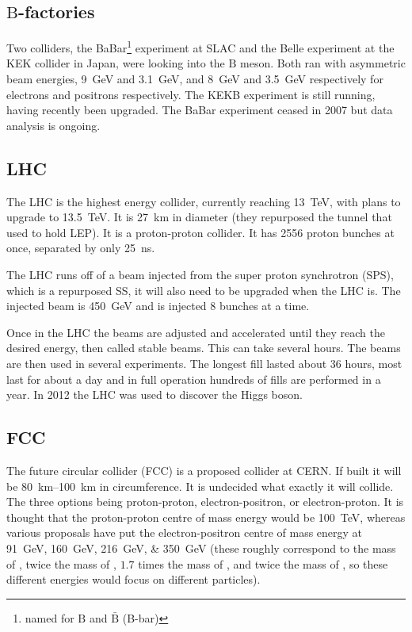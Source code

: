 \documentclass[fleqn]{NotesClass}
\makeatletter
\newcommand{\PBASE@B}{\mathrm{B}}
\newcommand{\PB}{\ensuremath{\PBASE@B}}
\newcommand{\APB}{\ensuremath{\bar{\PBASE@B}}}
\makeatother
\begin{document}
    \subsection{\protect\PB-factories}
    Two colliders, the BaBar\footnote{named for \PB{} and \APB{} (B-bar)} experiment at SLAC and the Belle experiment at the KEK collider in Japan, were looking into the \PB{} meson.
    Both ran with asymmetric beam energies, \qty{9}{\giga\electronvolt} and \qty{3.1}{\giga\electronvolt}, and \qty{8}{\giga\electronvolt} and \qty{3.5}{\giga\electronvolt} respectively for electrons and positrons respectively.
    The KEKB experiment is still running, having recently been upgraded.
    The BaBar experiment ceased in 2007 but data analysis is ongoing.
    
    \subsection{LHC}
    The LHC is the highest energy collider, currently reaching \qty{13}{\tera\electronvolt}, with plans to upgrade to \qty{13.5}{\tera\electronvolt}.
    It is \qty{27}{\kilo\metre} in diameter (they repurposed the tunnel that used to hold LEP).
    It is a proton-proton collider.
    It has 2556 proton bunches at once, separated by only \qty{25}{\nano\second}.
    
    The LHC runs off of a beam injected from the super proton synchrotron (SPS), which is a repurposed S\Pp\APp S, it will also need to be upgraded when the LHC is.
    The injected beam is \qty{450}{\giga\electronvolt} and is injected 8 bunches at a time.
    
    Once in the LHC the beams are adjusted and accelerated until they reach the desired energy, then called stable beams.
    This can take several hours.
    The beams are then used in several experiments.
    The longest fill lasted about 36 hours, most last for about a day and in full operation hundreds of fills are performed in a year.
    In 2012 the LHC was used to discover the Higgs boson.
    
    \subsection{FCC}
    The future circular collider (FCC) is a proposed collider at CERN.
    If built it will be \qtyrange{80}{100}{\kilo\metre} in circumference.
    It is undecided what exactly it will collide.
    The three options being proton-proton, electron-positron, or electron-proton.
    It is thought that the proton-proton centre of mass energy would be \qty{100}{\tera\electronvolt}, whereas various proposals have put the electron-positron centre of mass energy at \qtylist{91;160;216;350}{\giga\electronvolt} (these roughly correspond to the mass of \PZ, twice the mass of \PWpm, \(1.7\) times the mass of \PHzero, and twice the mass of \Pt, so these different energies would focus on different particles).
    
\end{document}
